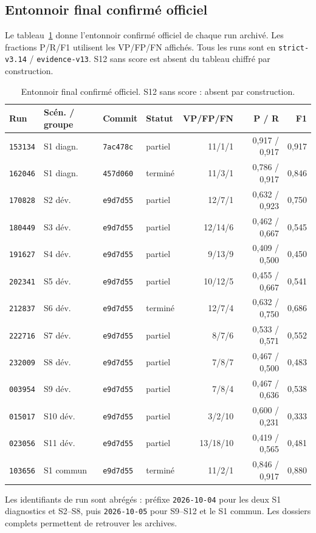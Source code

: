 \documentclass[11pt,a4paper]{article}
\newcommand{\code}[1]{{\urlstyle{tt}\nolinkurl{#1}}}
\begin{document}
\subsection{Entonnoir final confirm\'e officiel}
Le tableau~\ref{tab:funnel} donne l'entonnoir confirm\'e officiel de chaque run archiv\'e. Les fractions P/R/F1 utilisent les VP/FP/FN affich\'es. Tous les runs sont en \code{strict-v3.14} / \code{evidence-v13}. S12 sans score est absent du tableau chiffr\'e par construction.
\begin{table}[H]
\centering
\small
\caption{Entonnoir final confirm\'e officiel. S12 sans score : absent par construction.}
\label{tab:funnel}
\setlength{\tabcolsep}{4pt}
\begin{tabular}{llllrrr}
\toprule
Run & Sc\'en. / groupe & Commit & Statut & VP/FP/FN & P / R & F1\\
\midrule
\code{153134} & S1 diagn. & \code{7ac478c} & partiel & 11/1/1 & 0,917 / 0,917 & 0,917\\
\code{162046} & S1 diagn. & \code{457d060} & termin\'e & 11/3/1 & 0,786 / 0,917 & 0,846\\
\code{170828} & S2 d\'ev. & \code{e9d7d55} & partiel & 12/7/1 & 0,632 / 0,923 & 0,750\\
\code{180449} & S3 d\'ev. & \code{e9d7d55} & partiel & 12/14/6 & 0,462 / 0,667 & 0,545\\
\code{191627} & S4 d\'ev. & \code{e9d7d55} & partiel & 9/13/9 & 0,409 / 0,500 & 0,450\\
\code{202341} & S5 d\'ev. & \code{e9d7d55} & partiel & 10/12/5 & 0,455 / 0,667 & 0,541\\
\code{212837} & S6 d\'ev. & \code{e9d7d55} & termin\'e & 12/7/4 & 0,632 / 0,750 & 0,686\\
\code{222716} & S7 d\'ev. & \code{e9d7d55} & partiel & 8/7/6 & 0,533 / 0,571 & 0,552\\
\code{232009} & S8 d\'ev. & \code{e9d7d55} & partiel & 7/8/7 & 0,467 / 0,500 & 0,483\\
\code{003954} & S9 d\'ev. & \code{e9d7d55} & partiel & 7/8/4 & 0,467 / 0,636 & 0,538\\
\code{015017} & S10 d\'ev. & \code{e9d7d55} & partiel & 3/2/10 & 0,600 / 0,231 & 0,333\\
\code{023056} & S11 d\'ev. & \code{e9d7d55} & partiel & 13/18/10 & 0,419 / 0,565 & 0,481\\
\code{103656} & S1 commun & \code{e9d7d55} & termin\'e & 11/2/1 & 0,846 / 0,917 & 0,880\\
\bottomrule
\end{tabular}
\end{table}
Les identifiants de run sont abr\'eg\'es : pr\'efixe \code{2026-10-04} pour les deux S1 diagnostics et S2--S8, puis \code{2026-10-05} pour S9--S12 et le S1 commun. Les dossiers complets permettent de retrouver les archives.
\end{document}
